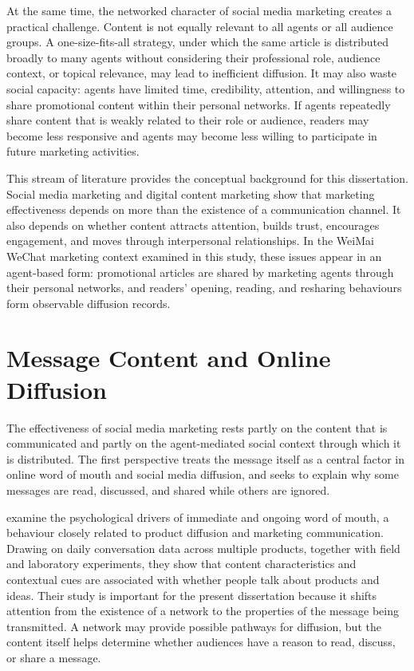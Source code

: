 At the same time, the networked character of social media marketing creates a practical challenge. Content is not equally relevant to all agents or all audience groups. A one-size-fits-all strategy, under which the same article is distributed broadly to many agents without considering their professional role, audience context, or topical relevance, may lead to inefficient diffusion. It may also waste social capacity: agents have limited time, credibility, attention, and willingness to share promotional content within their personal networks. If agents repeatedly share content that is weakly related to their role or audience, readers may become less responsive and agents may become less willing to participate in future marketing activities.

This stream of literature provides the conceptual background for this dissertation. Social media marketing and digital content marketing show that marketing effectiveness depends on more than the existence of a communication channel. It also depends on whether content attracts attention, builds trust, encourages engagement, and moves through interpersonal relationships. In the WeiMai WeChat marketing context examined in this study, these issues appear in an agent-based form: promotional articles are shared by marketing agents through their personal networks, and readers' opening, reading, and resharing behaviours form observable diffusion records.

\section{Message Content and Online Diffusion}
\label{sec:2-2-message-content-and-online-diffusion}

The effectiveness of social media marketing rests partly on the content that is communicated and partly on the agent-mediated social context through which it is distributed. The first perspective treats the message itself as a central factor in online word of mouth and social media diffusion, and seeks to explain why some messages are read, discussed, and shared while others are ignored.

\textcite{berger2011} examine the psychological drivers of immediate and ongoing word of mouth, a behaviour closely related to product diffusion and marketing communication. Drawing on daily conversation data across multiple products, together with field and laboratory experiments, they show that content characteristics and contextual cues are associated with whether people talk about products and ideas. Their study is important for the present dissertation because it shifts attention from the existence of a network to the properties of the message being transmitted. A network may provide possible pathways for diffusion, but the content itself helps determine whether audiences have a reason to read, discuss, or share a message.

